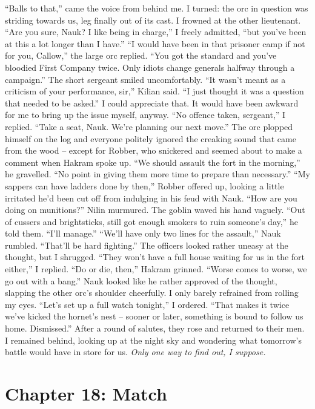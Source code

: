 \documentclass[12pt, openany]{book}
\begin{document}
“Balls to that,” came the voice from behind me.
I turned: the orc in question was striding towards us, leg finally out of its cast. I frowned at the other lieutenant.
“Are you sure, Nauk? I like being in charge,” I freely admitted, “but you’ve been at this a lot longer than I have.”
“I would have been in that prisoner camp if not for you, Callow,” the large orc replied. “You got the standard and you’ve bloodied First Company twice. Only idiots change generals halfway through a campaign.”
The short sergeant smiled uncomfortably.
“It wasn’t meant as a criticism of your performance, sir,” Kilian said. “I just thought it was a question that needed to be asked.”
I could appreciate that. It would have been awkward for me to bring up the issue myself, anyway.
“No offence taken, sergeant,” I replied. “Take a seat, Nauk. We’re planning our next move.”
The orc plopped himself on the log and everyone politely ignored the creaking sound that came from the wood – except for Robber, who snickered and seemed about to make a comment when Hakram spoke up.
“We should assault the fort in the morning,” he gravelled. “No point in giving them more time to prepare than necessary.”
“My sappers can have ladders done by then,” Robber offered up, looking a little irritated he’d been cut off from indulging in his feud with Nauk.
“How are you doing on munitions?” Nilin murmured.
The goblin waved his hand vaguely.
“Out of cussers and brightsticks, still got enough smokers to ruin someone’s day,” he told them. “I’ll manage.”
“We’ll have only two lines for the assault,” Nauk rumbled. “That’ll be hard fighting.”
The officers looked rather uneasy at the thought, but I shrugged.
“They won’t have a full house waiting for us in the fort either,” I replied.
“Do or die, then,” Hakram grinned. “Worse comes to worse, we go out with a bang.”
Nauk looked like he rather approved of the thought, slapping the other orc’s shoulder cheerfully. I only barely refrained from rolling my eyes.
“Let’s set up a full watch tonight,” I ordered. “That makes it twice we’ve kicked the hornet’s nest – sooner or later, something is bound to follow us home. Dismissed.”
After a round of salutes, they rose and returned to their men. I remained behind, looking up at the night sky and wondering what tomorrow’s battle would have in store for us. \textit{Only one way to find out, I suppose.}
\clearpage
\chapter{Chapter 18: Match}
\end{document}
